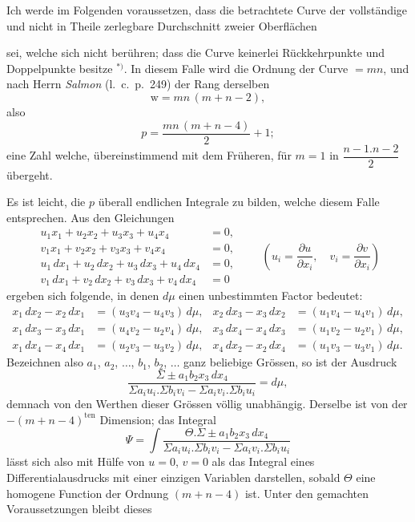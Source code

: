 \documentclass{article}
\begin{document}
Ich werde im Folgenden voraussetzen, dass die betrachtete Curve der vollständige und nicht in Theile zerlegbare Durchschnitt zweier Oberflächen

sei, welche sich nicht berühren; dass die Curve keinerlei Rückkehrpunkte und Doppelpunkte besitze ${}^{*)}$. In diesem Falle wird die Ordnung der Curve $=mn$, und nach Herrn \emph{Salmon} (l.\ c.\ p.\ 249) der Rang derselben
\[
\mathrm{w} = mn\,(m+n-2),
\]
also
\[
p = \frac{mn\,(m+n-4)}{2}+1;
\]
eine Zahl welche, übereinstimmend mit dem Früheren, für $m=1$ in $\dfrac{n-1.n-2}{2}$ übergeht.

Es ist leicht, die $p$ überall endlichen Integrale zu bilden, welche diesem Falle entsprechen. Aus den Gleichungen
\[
\begin{aligned}
u_{1} x_{1}+u_{2} x_{2}+u_{3} x_{3}+u_{4} x_{4} &= 0,\\
v_{1} x_{1}+v_{2} x_{2}+v_{3} x_{3}+v_{4} x_{4} &= 0,\\
u_{1}\,dx_{1}+u_{2}\,dx_{2}+u_{3}\,dx_{3}+u_{4}\,dx_{4} &= 0,\\
v_{1}\,dx_{1}+v_{2}\,dx_{2}+v_{3}\,dx_{3}+v_{4}\,dx_{4} &= 0
\end{aligned}
\qquad
\left(u_{i} = \frac{\partial u}{\partial x_{i}}, \quad v_{i} = \frac{\partial v}{\partial x_{i}}\right)
\]
ergeben sich folgende, in denen $d\mu$ einen unbestimmten Factor bedeutet:
\[
\begin{aligned}
x_{1}\,dx_{2}-x_{2}\,dx_{1} &= (u_{3} v_{4}-u_{4} v_{3})\,d\mu, & x_{2}\,dx_{3}-x_{3}\,dx_{2} &= (u_{1} v_{4}-u_{4} v_{1})\,d\mu,\\
x_{1}\,dx_{3}-x_{3}\,dx_{1} &= (u_{4} v_{2}-u_{2} v_{4})\,d\mu, & x_{3}\,dx_{4}-x_{4}\,dx_{3} &= (u_{1} v_{2}-u_{2} v_{1})\,d\mu,\\
x_{1}\,dx_{4}-x_{4}\,dx_{1} &= (u_{2} v_{3}-u_{3} v_{2})\,d\mu, & x_{4}\,dx_{2}-x_{2}\,dx_{4} &= (u_{1} v_{3}-u_{3} v_{1})\,d\mu.
\end{aligned}
\]
Bezeichnen also $a_{1}$, $a_{2}$, $\ldots$, $b_{1}$, $b_{2}$, $\ldots$ ganz beliebige Grössen, so ist der Ausdruck
\[
\frac{\Sigma \pm a_{1} b_{2} x_{3}\,dx_{4}}{\Sigma a_{i} u_{i}.\Sigma b_{i} v_{i} - \Sigma a_{i} v_{i}.\Sigma b_{i} u_{i}} = d\mu,
\]
demnach von den Werthen dieser Grössen völlig unabhängig. Derselbe ist von der $-(m+n-4)^{\text{ten}}$ Dimension; das Integral
\[
\Psi = \int \frac{\Theta.\Sigma \pm a_{1} b_{2} x_{3}\,dx_{4}}{\Sigma a_{i} u_{i}.\Sigma b_{i} v_{i} - \Sigma a_{i} v_{i}.\Sigma b_{i} u_{i}}
\]
lässt sich also mit Hülfe von $u=0$, $v=0$ als das Integral eines Differentialausdrucks mit einer einzigen Variablen darstellen, sobald $\Theta$ eine homogene Function der Ordnung $(m+n-4)$ ist. Unter den gemachten Voraussetzungen bleibt dieses
\end{document}
